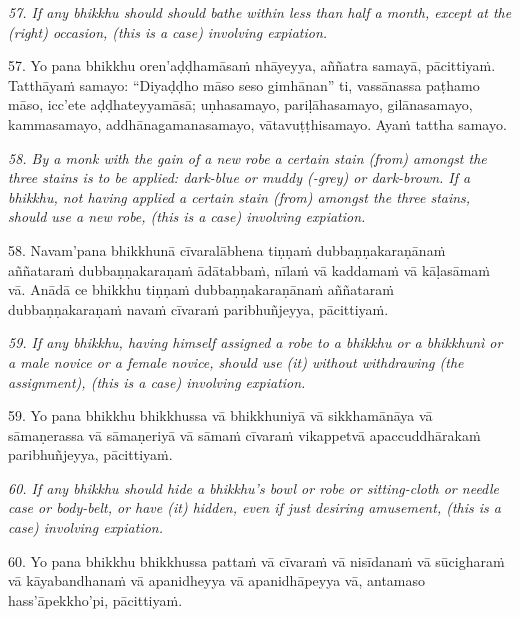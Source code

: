 \documentclass[11pt]{article}
\begin{document}
\begin{paracol}{2}
\begin{column}
{\itshape\footnotesize
57. If any bhikkhu should should bathe within less than half a month, except at the (right) occasion, (this is a case) involving expiation.
}
\switchcolumn

\begin{flushleft}
57. Yo pana bhikkhu oren’aḍḍhamāsaṁ nhāyeyya, aññatra samayā, pācittiyaṁ. Tatthāyaṁ samayo: “Diyaḍḍho māso seso gimhānan” ti, vassānassa paṭhamo māso, icc’ete aḍḍhateyyamāsā; uṇhasamayo, pariḷāhasamayo, gilānasamayo, kammasamayo, addhānagamanasamayo, vātavuṭṭhisamayo. Ayaṁ tattha samayo.
\switchcolumn*
\end{flushleft}

{\itshape\footnotesize
58. By a monk with the gain of a new robe a certain stain (from) amongst the three stains is to be applied: dark-blue or muddy (-grey) or dark-brown. If a bhikkhu, not having applied a certain stain (from) amongst the three stains, should use a new robe, (this is a case) involving expiation.
}
\switchcolumn

\begin{flushleft}
58. Navam’pana bhikkhunā cīvaralābhena tiṇṇaṁ dubbaṇṇakaraṇānaṁ aññataraṁ dubbaṇṇakaraṇaṁ ādātabbaṁ, nīlaṁ vā kaddamaṁ vā kāḷasāmaṁ vā. Anādā ce bhikkhu tiṇṇaṁ dubbaṇṇakaraṇānaṁ aññataraṁ dubbaṇṇakaraṇaṁ navaṁ cīvaraṁ paribhuñjeyya, pācittiyaṁ.
\switchcolumn*
\end{flushleft}

{\itshape\footnotesize
59. If any bhikkhu, having himself assigned a robe to a bhikkhu or a bhikkhunì or a male novice or a female novice, should use (it) without withdrawing (the assignment), (this is a case) involving expiation.
}
\switchcolumn

\begin{flushleft}
59. Yo pana bhikkhu bhikkhussa vā bhikkhuniyā vā sikkhamānāya vā sāmaṇerassa vā sāmaṇeriyā vā sāmaṁ cīvaraṁ vikappetvā apaccuddhārakaṁ paribhuñjeyya, pācittiyaṁ.
\switchcolumn*
\end{flushleft}

{\itshape\footnotesize
60. If any bhikkhu should hide a bhikkhu's bowl or robe or sitting-cloth or needle case or body-belt, or have (it) hidden, even if just desiring amusement, (this is a case) involving expiation.
}
\switchcolumn

\begin{flushleft}
60. Yo pana bhikkhu bhikkhussa pattaṁ vā cīvaraṁ vā nisīdanaṁ vā sūcigharaṁ vā kāyabandhanaṁ vā apanidheyya vā apanidhāpeyya vā, antamaso hass’āpekkho’pi, pācittiyaṁ.
\switchcolumn*
\end{flushleft}


\end{column}
\end{paracol}
\end{document}
